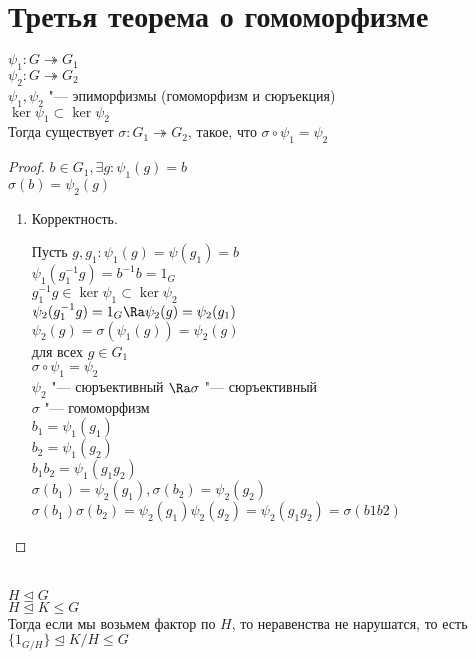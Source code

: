 ﻿\section{Третья теорема о гомоморфизме}
\begin{theorem}
$\psi_1 \colon G \twoheadrightarrow G_1$ \\
$\psi_2 \colon G \twoheadrightarrow G_2$ \\
$\psi_1, \psi_2$ "--- эпиморфизмы (гомоморфизм и сюръекция)\\
$\ker \psi_1 \subset \ker \psi_2$\\
Тогда существует $\sigma \colon G_1 \twoheadrightarrow G_2$, такое, что $\sigma \circ \psi_1 = \psi_2$\\
\end{theorem}
\begin{proof}
$b \in G_1, \exists g \colon \psi_1(g) = b$\\
$\sigma (b) = \psi_2(g)$\\

\begin{enumerate}
\item Корректность.

Пусть $g, g_1 \colon \psi_1(g) = \psi(g_1) = b$\\
$\psi_1(g_1^{-1}g) = b^{-1}b = 1_G$\\
$g_1^{-1}g \in \ker \psi_1 \subset \ker \psi_2$\\
$\psi_2(g_1^{-1}g) = 1_G \Ra \psi_2(g) = \psi_2(g_1)$\\

$\psi_2(g) = \sigma(\psi_1(g)) = \psi_2(g)$\\
для всех $g \in G_1$\\
$\sigma \circ \psi_1 = \psi_2$\\
$\psi_2$ "--- сюръективный $\Ra \sigma$ "--- сюръективный\\

$\sigma$ "--- гомоморфизм\\
$b_1 = \psi_1(g_1)$\\
$b_2 = \psi_1(g_2)$\\
$b_1b_2 = \psi_1(g_1g_2)$\\

$\sigma(b_1) = \psi_2(g_1), \sigma(b_2) = \psi_2(g_2)$\\
$\sigma(b_1)\sigma(b_2) = \psi_2(g_1) \psi_2(g_2) = \psi_2(g_1g_2) = \sigma(b1b2)$\\
\end{enumerate}
\end{proof}
\begin{Rem} \hfill\\
$H \unlhd G$\\
$H \unlhd K \le G$\\
Тогда если мы возьмем фактор по $H$, то неравенства не
нарушатся, то есть
$\{1_{G/H}\} \unlhd K/H \le G$\\
\end{Rem}

